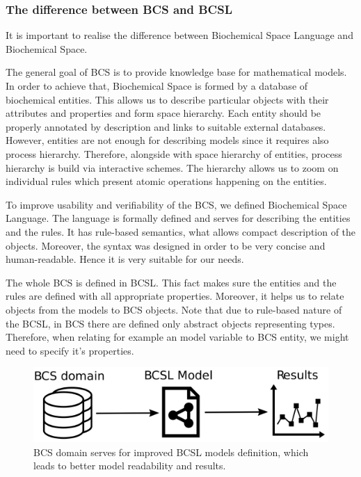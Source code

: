 \documentclass[12pt]{fithesis2}
\begin{document}
\subsubsection{The difference between BCS and BCSL}

It is important to realise the difference between Biochemical Space Language and Biochemical Space. 

The general goal of BCS is to provide knowledge base for mathematical models. In order to achieve that, Biochemical Space is formed by a database of biochemical entities. This allows us to describe particular objects with their attributes and properties and form space hierarchy. Each entity should be properly annotated by description and links to suitable external databases. However, entities are not enough for describing models since it requires also process hierarchy. Therefore, alongside with space hierarchy of entities, process hierarchy is build via interactive schemes. The hierarchy allows us to zoom on individual rules which present atomic operations happening on the entities.

To improve usability and verifiability of the BCS, we defined Biochemical Space Language. The language is formally defined and serves for describing the entities and the rules. It has rule-based semantics, what allows compact description of the objects. Moreover, the syntax was designed in order to be very concise and human-readable. Hence it is very suitable for our needs.

The whole BCS is defined in BCSL. This fact makes sure the entities and the rules are defined with all appropriate properties. Moreover, it helps us to relate objects from the models to BCS objects. Note that due to rule-based nature of the BCSL, in BCS there are defined only abstract objects representing types. Therefore, when relating for example an model variable to BCS entity, we might need to specify it's properties. 

\begin{figure}[!h]
\begin{center}
  \includegraphics[scale=0.13]{pics/bcsl_vs_bcs.pdf}
\end{center}
\caption{BCS domain serves for improved BCSL models definition, which leads to better model readability and results.}
\end{figure}
\end{document}
